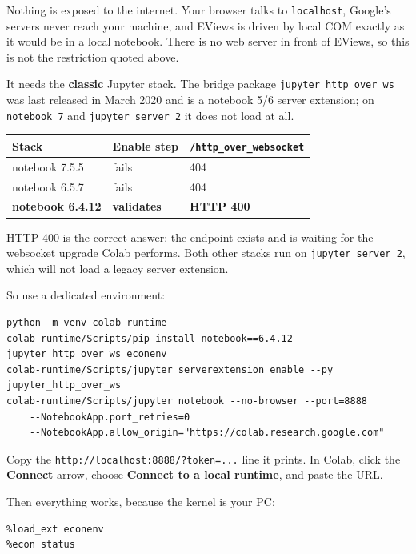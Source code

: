 \documentclass[11pt,a4paper]{report}
\begin{document}
\begin{note}
Nothing is exposed to the internet. Your browser talks to \texttt{localhost},
Google's servers never reach your machine, and EViews is driven by local COM
exactly as it would be in a local notebook. There is no web server in front of
EViews, so this is not the restriction quoted above.
\end{note}

It needs the \textbf{classic} Jupyter stack. The bridge package
\texttt{jupyter\_http\_over\_ws} was last released in March 2020 and is a
notebook 5/6 server extension; on \texttt{notebook 7} and
\texttt{jupyter\_server 2} it does not load at all.

\begin{center}
\begin{tabular}{@{}lll@{}}
\toprule
\textbf{Stack} & \textbf{Enable step} & \texttt{/http\_over\_websocket} \\
\midrule
notebook 7.5.5 & fails & 404 \\
notebook 6.5.7 & fails & 404 \\
\textbf{notebook 6.4.12} & \textbf{validates} & \textbf{HTTP 400} \\
\bottomrule
\end{tabular}
\end{center}

HTTP 400 is the correct answer: the endpoint exists and is waiting for the
websocket upgrade Colab performs. Both other stacks run on
\texttt{jupyter\_server 2}, which will not load a legacy server extension.

So use a dedicated environment:

\begin{lstlisting}
python -m venv colab-runtime
colab-runtime/Scripts/pip install notebook==6.4.12 jupyter_http_over_ws econenv
colab-runtime/Scripts/jupyter serverextension enable --py jupyter_http_over_ws
colab-runtime/Scripts/jupyter notebook --no-browser --port=8888
    --NotebookApp.port_retries=0
    --NotebookApp.allow_origin="https://colab.research.google.com"
\end{lstlisting}

Copy the \texttt{http://localhost:8888/?token=...} line it prints. In Colab,
click the \textbf{Connect} arrow, choose \textbf{Connect to a local runtime},
and paste the URL.

Then everything works, because the kernel is your PC:

\begin{lstlisting}
%load_ext econenv
%econ status
\end{lstlisting}
\end{document}

